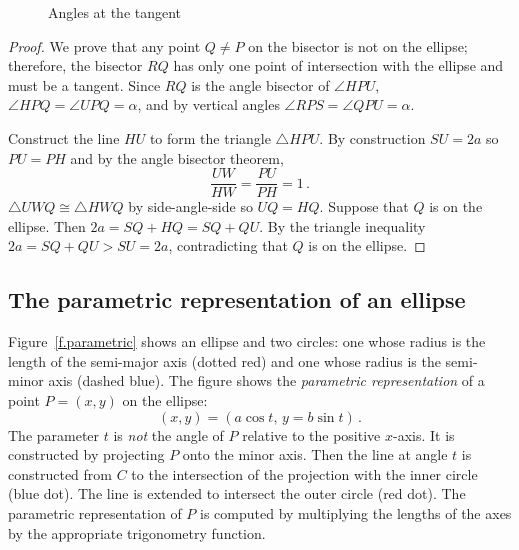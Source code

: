 \begin{figure}[b]
\begin{center}
\caption{Angles at the tangent}\label{f.tangent-angles}
\end{center}
\end{figure}


\begin{proof} 
We prove that any point $Q\neq P$ on the bisector is not on the ellipse; therefore, the bisector $RQ$ has only one point of intersection with the ellipse and must be a tangent. Since $RQ$ is the angle bisector of $\angle HPU$, $\angle HPQ =\angle UPQ=\alpha$, and by vertical angles $\angle RPS=\angle QPU=\alpha$.

Construct the line $HU$ to form the triangle $\triangle HPU$. By construction $SU=2a$ so $PU=PH$ and by the angle bisector theorem,
\[
\frac{UW}{HW}=\frac{PU}{PH} = 1\,.
\] 
$\triangle UWQ\cong\triangle HWQ$ by side-angle-side so $UQ=HQ$. Suppose that $Q$ is on the ellipse. Then $2a=SQ+HQ=SQ+QU$. By the triangle inequality $2a=SQ+QU>SU=2a$, contradicting that $Q$ is on the ellipse.\hqed
\end{proof}


\subsection{The parametric representation of an ellipse}

Figure~\ref{f.parametric} shows an ellipse and two circles: one whose radius is the length of the semi-major axis (dotted red) and one whose radius is the semi-minor axis (dashed blue). The figure shows the \emph{parametric representation} of a point $P=(x,y)$ on the ellipse:
\[
(x,y)= (a\cos t,\, y = b \sin t)\,.
\]
The parameter $t$ is \emph{not} the angle of $P$ relative to the positive $x$-axis. It is constructed by projecting $P$ onto the minor axis. Then the line at angle $t$ is constructed from $C$ to the intersection of the projection with the inner circle (blue dot). The line is extended to intersect the outer circle (red dot). The parametric representation of $P$ is computed by multiplying the lengths of the axes by the appropriate trigonometry function.

